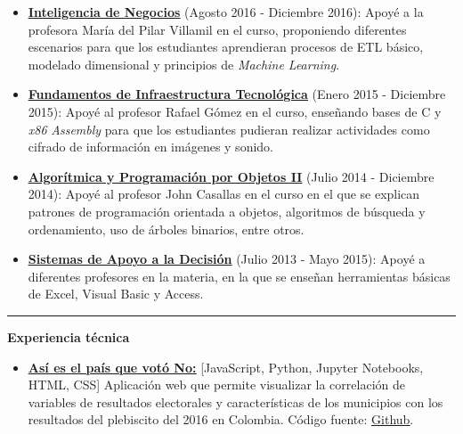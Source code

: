\documentclass[10pt]{article}
\begin{document}
{\begin{itemize}
    \item \textcolor{blue}{\href{https://sistemasacademico.uniandes.edu.co/~isis3301/dokuwiki/doku.php}{\underline{\textbf{Inteligencia de Negocios}}}} (Agosto 2016 - Diciembre 2016): Apoyé a la profesora María del Pilar Villamil en el curso, proponiendo diferentes escenarios para que los estudiantes aprendieran procesos de \textsc{ETL} básico, modelado dimensional y principios de \textit{Machine Learning}.
	\item \textcolor{blue}{\href{https://sistemasacademico.uniandes.edu.co/~isis1304/dokuwiki/doku.php}{\underline{\textbf{Fundamentos de Infraestructura Tecnológica}}}} (Enero 2015 - Diciembre 2015):
	Apoyé al profesor Rafael Gómez en el curso, enseñando bases de \textsc{C} y \textit{x86} \textit{Assembly} para que los estudiantes pudieran realizar actividades como cifrado de información en imágenes y sonido.
	\item \textcolor{blue}{\href{https://sistemasacademico.uniandes.edu.co/~isis1205/dokuwiki/doku.php}{\underline{\textbf{Algorítmica y Programación por Objetos II}}}} (Julio 2014 - Diciembre 2014):
	Apoyé al profesor John Casallas en el curso en el que se explican patrones de programación orientada a objetos, algoritmos de búsqueda y ordenamiento, uso de árboles binarios, entre otros.
	\item \textcolor{blue}{\href{http://catalogo.uniandes.edu.co/2014/Catalog/Courses/IIND/2000/IIND-2109}{\underline{\textbf{Sistemas de Apoyo a la Decisión}}}} (Julio 2013 - Mayo 2015):
	Apoyé a diferentes profesores en la materia, en la que se enseñan herramientas básicas de Excel, Visual Basic y Access.
\end{itemize}

\vspace{0.25cm}
\hrule
\vspace{0.25cm}
{\large \textbf{Experiencia técnica}}
\vspace{0.25cm}
{\footnotesize\begin{itemize}

\item \textcolor{blue}{\href{http://bl.ocks.org/mvanegas10/raw/3bd6d116da4ed96d212e783060720c5d/}{\underline{\textbf{Así es el país que votó No:}}}} [JavaScript, Python, Jupyter Notebooks, \textsc{HTML}, \textsc{CSS}]  Aplicación web que permite visualizar la correlación de variables de resultados electorales y características de los municipios con los resultados del plebiscito del 2016 en Colombia. Código fuente: \textcolor{blue}{\href{https://github.com/mvanegas10/Plebiscito-Colombia-2016}{\underline{Github}}}.


\end{itemize}}}
\end{document}
